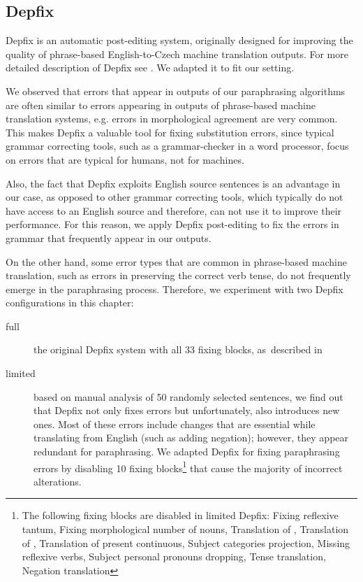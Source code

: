 \subsection{Depfix}
\label{depfix}
Depfix is an automatic post-editing system, originally designed for improving 
the quality of phrase-based English-to-Czech machine translation outputs.
For more detailed description of Depfix see . We adapted it 
to fit our setting.

We observed that errors that appear in outputs of our paraphrasing algorithms 
are often similar to errors appearing in outputs of phrase-based machine 
translation systems, e.g. errors in morphological agreement are very common.
This makes Depfix a valuable tool for fixing substitution errors, since typical
grammar correcting tools, such as a grammar-checker in a word processor,
focus on errors that are typical for humans, not for machines.

Also, the fact that Depfix exploits English source sentences is an advantage 
in our case, as opposed to other grammar correcting tools, which typically do 
not have access to an English source and therefore, can not use it to improve 
their performance. For this reason, we apply Depfix post-editing to fix the 
errors in grammar that frequently appear in our outputs.

On the other hand, some error types that are common in phrase-based machine 
translation, such as errors in preserving the correct verb tense, do not 
frequently emerge in the paraphrasing process. Therefore, we experiment with 
two Depfix configurations in this chapter:

\begin{description}
\item[full] the original Depfix system with all 33 fixing blocks, as~described 
in \cite{rosa:mgr}
\item[limited] based on manual analysis of 50 randomly selected sentences, we 
find out that Depfix not only fixes errors but unfortunately, also introduces new 
ones. Most of these errors include changes that are essential while translating 
from English (such as adding negation); however, they appear redundant for 
paraphrasing. We adapted Depfix for fixing paraphrasing errors by disabling 10 
fixing blocks\footnote{The following fixing blocks are disabled in limited 
Depfix: Fixing reflexive tantum, Fixing morphological number of nouns, 
Translation of , Translation of , Translation of present 
continuous, Subject categories projection, Missing reflexive verbs, Subject 
personal pronouns dropping, Tense translation, Negation translation} that cause 
the majority of incorrect alterations.
\end{description}


